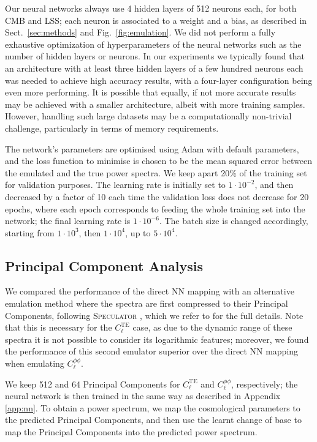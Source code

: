 \documentclass[fleqn,usenatbib]{mnras}
\begin{document}
Our neural networks always use 4 hidden layers of 512 neurons each, for both CMB and LSS; each neuron is associated to a weight and a bias, as described in Sect.~\ref{sec:methods} and Fig.~\ref{fig:emulation}. We did not perform a fully exhaustive optimization of hyperparameters of the neural networks such as the number of hidden layers or neurons. In our experiments we typically found that an architecture with at least three hidden layers of a few hundred neurons each was needed to achieve high accuracy results, with a four-layer configuration being even more performing. It is possible that equally, if not more accurate results may be achieved with a smaller architecture, albeit with more training samples. However, handling such large datasets may be a computationally non-trivial challenge, particularly in terms of memory requirements.

The network's parameters are optimised using Adam \citep{Kingma14} with default parameters, and the loss function to minimise is chosen to be the mean squared error between the emulated and the true power spectra. We keep apart 20\% of the training set for validation purposes. The learning rate is initially set to $1\cdot10^{-2}$, and then decreased by a factor of 10 each time the validation loss does not decrease for 20 epochs, where each epoch corresponds to feeding the whole training set into the network; the final learning rate is $1\cdot10^{-6}$. The batch size is changed accordingly, starting from $1\cdot10^3$, then $1\cdot10^4$, up to $5\cdot10^4$.


\subsection{Principal Component Analysis}
\label{app:pca}
We compared the performance of the direct NN mapping with an alternative emulation method where the spectra are first compressed to their Principal Components, following \textsc{Speculator} \citep{Alsing20}, which we refer to for the full details. Note that this is necessary for the $C_{\ell}^{\textrm{TE}}$ case, as due to the dynamic range of these spectra it is not possible to consider its logarithmic features; moreover, we found the performance of this second emulator superior over the direct NN mapping when emulating $C_{\ell}^{\phi \phi}$.

We keep 512 and 64 Principal Components for $C_{\ell}^{\textrm{TE}}$ and $C_{\ell}^{\phi \phi}$, respectively; the neural network is then trained in the same way as described in Appendix \ref{app:nn}. To obtain a power spectrum, we map the cosmological parameters to the predicted Principal Components, and then use the learnt change of base to map the Principal Components into the predicted power spectrum.
\end{document}
